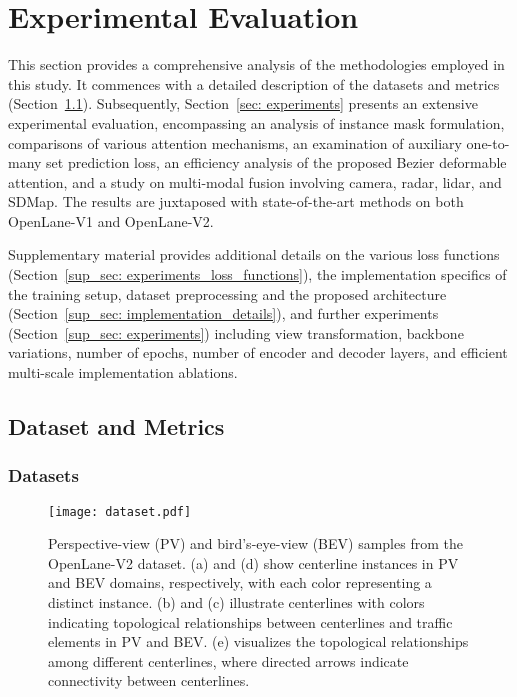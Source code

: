 \section{Experimental Evaluation}

This section provides a comprehensive analysis of the methodologies employed in this study. It commences with a detailed description of the datasets and metrics (Section~\ref{sec: dataset_and_metrics}). Subsequently, Section~\ref{sec: experiments} presents an extensive experimental evaluation, encompassing an analysis of instance mask formulation, comparisons of various attention mechanisms, an examination of auxiliary one-to-many set prediction loss, an efficiency analysis of the proposed Bezier deformable attention, and a study on multi-modal fusion involving camera, radar, lidar, and SDMap. The results are juxtaposed with state-of-the-art methods on both OpenLane-V1 and OpenLane-V2.

Supplementary material provides additional details on the various loss functions (Section~\ref{sup_sec: experiments_loss_functions}), the implementation specifics of the training setup, dataset preprocessing and the proposed architecture (Section~\ref{sup_sec: implementation_details}), and further experiments (Section~\ref{sup_sec: experiments}) including view transformation, backbone variations, number of epochs, number of encoder and decoder layers, and efficient multi-scale implementation ablations.


\subsection{Dataset and Metrics}
\label{sec: dataset_and_metrics}

\subsubsection{Datasets}

\begin{figure}[tb]
  \centering
  \texttt{[image: dataset.pdf]}
  \caption{Perspective-view (PV) and bird’s-eye-view (BEV) samples from the OpenLane-V2 dataset. (a) and (d) show centerline instances in PV and BEV domains, respectively, with each color representing a distinct instance. (b) and (c) illustrate centerlines with colors indicating topological relationships between centerlines and traffic elements in PV and BEV. (e) visualizes the topological relationships among different centerlines, where directed arrows indicate connectivity between centerlines.}
  \label{fig: dataset_figure}
\end{figure}

